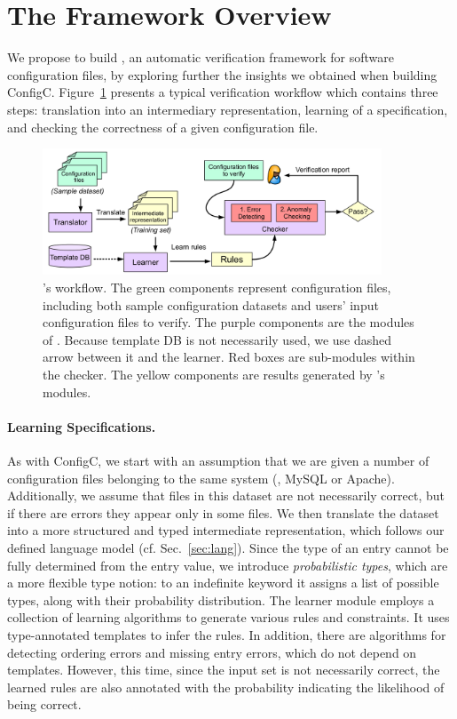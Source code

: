 
\section{The \app Framework Overview}
\label{sec:overview}

We propose to build \app, an automatic verification framework for 
software configuration files, by exploring further the insights we 
obtained when building ConfigC. Figure~\ref{fig-overview} presents
a typical \app verification workflow which contains three steps:
translation into an intermediary representation, learning of a specification,
and checking the correctness of a given configuration file. 

\begin{figure}[htbp] \centering
\includegraphics[width=0.9\textwidth]{figs/overview}
\caption{\app's workflow. The green components represent configuration 
  files, including both sample configuration datasets and users' input
  configuration files to verify. 
  The purple components are the modules of \app.
  Because template DB is not necessarily used, we use dashed
  arrow between it and the learner.
  Red boxes are sub-modules within the checker.
  The yellow components are results generated by \app's modules.}
\label{fig-overview}
\end{figure}

\paragraph{Learning Specifications.}
As with ConfigC, we start with an assumption 
that we are given a number of 
configuration files belonging to the same system (\eg, MySQL or Apache).
Additionally, we assume that files in this dataset are 
not necessarily correct, but if there are errors they appear only in some
files. We then translate the dataset into a more structured
and typed intermediate representation, which follows
our defined language model (cf. Sec.~\ref{sec:lang}).
Since the type of an entry cannot be fully determined from 
the entry value, we introduce {\em probabilistic types}, which are
a more flexible type notion: to an indefinite keyword it 
assigns a list of possible types, along with their probability 
distribution. The learner module employs a collection of learning
 algorithms to generate various rules and constraints.
It uses type-annotated templates to infer the rules. In addition, 
there are algorithms for detecting ordering errors and missing entry
errors, which do not depend on templates. However, this time, 
since the input set is not necessarily correct, the learned rules are
also annotated with the probability indicating the likelihood of being 
correct. 
 
